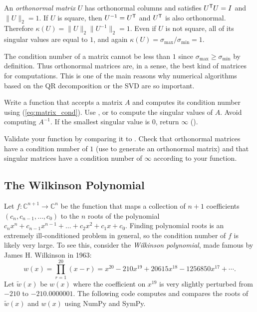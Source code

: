 \begin{info} %
An \emph{orthonormal matrix} $U$ has orthonormal columns and satisfies $U^{\mathsf T} U = I$ and $\|U\|_2 = 1$.
If $U$ is square, then $U^{-1} = U^{\mathsf T}$ and $U^{\mathsf T}$ is also orthonormal.
Therefore $\kappa(U) = \|U\|_2\|U^{-1}\|_2 = 1$.
Even if $U$ is not square, all of its singular values are equal to $1$, and again $\kappa(U) = \sigma_{\max} / \sigma_{\min} = 1$.

The condition number of a matrix cannot be less than $1$ since $\sigma_{\max} \ge \sigma_{\min}$ by definition.
Thus orthonormal matrices are, in a sense, the best kind of matrices for computations.
This is one of the main reasons why numerical algorithms based on the QR decomposition or the SVD are so important.
\end{info}

\begin{problem} %
Write a function that accepts a matrix $A$ and computes its condition number using (\ref{eq:matrix_cond}).
Use , or  to compute the singular values of $A$.
Avoid computing $A^{-1}$.
If the smallest singular value is $0$, return $\infty$ ().

Validate your function by comparing it to .
Check that orthonormal matrices have a condition number of $1$ (use  to generate an orthonormal matrix) and that singular matrices have a condition number of $\infty$ according to your function.
\end{problem}


\subsection*{The Wilkinson Polynomial} %

Let $f:\mathbb{C}^{n+1} \rightarrow \mathbb{C}^n$ be the function that maps a collection of $n+1$ coefficients $(c_n, c_{n-1}, \ldots, c_0)$ to the $n$ roots of the polynomial $c_nx^n+c_{n-1}x^{n-1}+\ldots+c_2x^2+c_1x+c_0$.
Finding polynomial roots is an extremely ill-conditioned problem in general, so the condition number of $f$ is likely very large.
To see this, consider the \emph{Wilkinson polynomial}, made famous by James H. Wilkinson in 1963:
\[
w(x) = \prod_{r=1}^{20}(x-r) = x^{20} - 210x^{19} + 20615x^{18} - 1256850x^{17} + \cdots.
\]
Let $\tilde{w}(x)$ be $w(x)$ where the coefficient on $x^{19}$ is very slightly perturbed from $-210$ to $-210.0000001$.
The following code computes and compares the roots of $\tilde{w}(x)$ and $w(x)$ using NumPy and SymPy.

